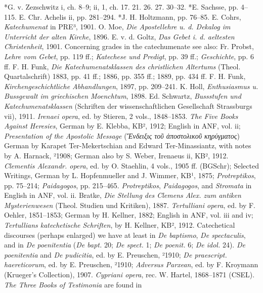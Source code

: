 *G. v. Zezschwitz i, ch. 8–9; ii, 1, ch. 17. 21. 26. 27. 30–32. *E. Sachsse, pp. 4–115. E. Chr. Achelis ii, pp. 281–294. *J. H. Holtzmann, pp. 76–85. E. Cohrs, \emph{Katechumenat} in PRE³, 1901. O. Moe, \emph{Die Apostellehre u. d. Dekalog im Unterricht der alten Kirche}, 1896. E. v. d. Goltz, \emph{Das Gebet i. d. aeltesten Christenheit}, 1901. Concerning grades in the catechumenate see also: Fr. Probst, \emph{Lehre vom Gebet}, pp. 119 ff.; \emph{Katechese und Predigt}, pp. 39 ff.; \emph{Geschichte}, pp. 6 ff. F. H. Funk, \emph{Die Katechumenatsklassen des christlichen Altertums} (Theol. Quartalschrift) 1883, pp. 41 ff.; 1886, pp. 355 ff.; 1889, pp. 434 ff. F. H. Funk, \emph{Kirchengeschichtliche Abhandlungen}, 1897, pp. 209–241. K. Holl, \emph{Enthusiasmus u. Bussgewalt im griechischen Moenchtum}, 1898. Ed. Schwartz, \emph{Bussstufen und Katechumenatsklassen} (Schriften der wissenschaftlichen Gesellschaft Strassburgs vii), 1911. \emph{Irenaei opera}, ed. by Stieren, 2 vols., 1848–1853. \emph{The Five Books Against Heresies}, German by E. Klebba, KB², 1912; English in ANF, vol. ii; \emph{Presentation of the Apostolic Message} (\emph{Ἔνδειξις τοῦ ἀποστολικοῦ κηρύγματος}) German by Karapet Ter-Mekertschian and Edward Ter-Minassiantz, with notes by A. Harnack, ²1908; German also by S. Weber, Irenaeus ii, KB², 1912. \emph{Clementis Alexandr. opera}, ed. by O. Staehlin, 4 vols., 1905 ff. (BGSchr); Selected Writings, German by L. Hopfenmueller and J. Wimmer, KB¹, 1875; \emph{Protreptikos}, pp. 75–214; \emph{Paidagogos}, pp. 215–465. \emph{Protreptikos}, \emph{Paidagogos}, and \emph{Stromata} in English in ANF, vol. ii. Bratke, \emph{Die Stellung des Clemens Alex. zum antiken Mysterienwesen} (Theol. Studien und Kritiken), 1887. \emph{Tertulliani opera}, ed. by F. Oehler, 1851–1853; German by H. Kellner, 1882; English in ANF, vol. iii and iv; \emph{Tertullians katechetische Schriften}, by H. Kellner, KB², 1912. Catechetical discourses (perhaps enlarged) we have at least in \emph{De baptismo}, \emph{De spectaculis}, and in \emph{De poenitentia} (\emph{De bapt.} 20; \emph{De spect.} 1; \emph{De poenit.} 6; \emph{De idol.} 24). \emph{De poenitentia} and \emph{De pudicitia}, ed. by E. Preuschen, ²1910; \emph{De praescript. haereticorum}, ed. by E. Preuschen, ²1910; \emph{Adversus Parxean}, ed. by F. Kroymann (Krueger's Collection), 1907. \emph{Cypriani opera}, rec. W. Hartel, 1868–1871 (CSEL). \emph{The Three Books of Testimonia} are found in
